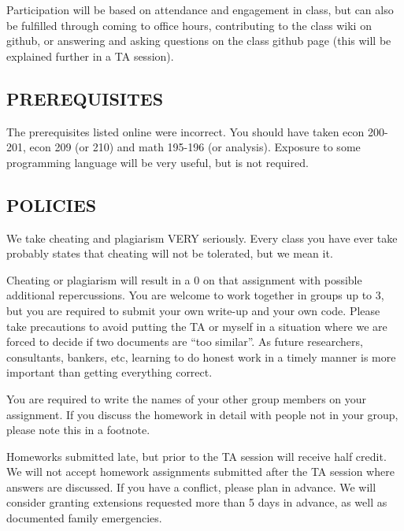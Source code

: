 \documentclass{scrartcl}
\begin{document}
Participation will be based on attendance and engagement in class, but can also be fulfilled through coming to office hours, contributing to the class wiki on github, or answering and asking questions on the class github page (this will be explained further in a TA session).

\subsection*{PREREQUISITES}
The prerequisites listed online were incorrect. You should have taken econ 200-201, econ 209 (or 210) and math 195-196 (or analysis). Exposure to some programming language will be very useful, but is not required. 

\subsection*{POLICIES}

We take cheating and plagiarism VERY seriously. Every class you have ever take probably states that cheating will not be tolerated, but we mean it. %

Cheating or plagiarism will result in a 0 on that assignment with possible additional repercussions. You are welcome to work together in groups up to 3, but you are required to submit your own write-up and your own code. Please take precautions to avoid putting the TA or myself in a situation where we are forced to decide if two documents are ``too similar''. As future researchers, consultants, bankers, etc, learning to do honest work in a timely manner is more important than getting everything correct.

You are required to write the names of your other group members on your assignment. If you discuss the homework in detail with people not in your group, please note this in a footnote.


Homeworks submitted late, but prior to the TA session will receive half credit. We will not accept homework assignments submitted after the TA session where answers are discussed. If you have a conflict, please plan in advance. We will consider granting extensions requested more than 5 days in advance, as well as documented family emergencies.
\end{document}
